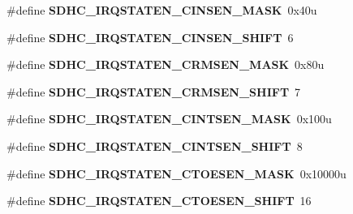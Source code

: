 \begin{DoxyCompactItemize}
\item 
\#define {\bfseries S\+D\+H\+C\+\_\+\+I\+R\+Q\+S\+T\+A\+T\+E\+N\+\_\+\+C\+I\+N\+S\+E\+N\+\_\+\+M\+A\+SK}~0x40u\hypertarget{group__SDHC__Register__Masks_ga28f8bc13ff1f5a489e41a54dc39e3152}{}\label{group__SDHC__Register__Masks_ga28f8bc13ff1f5a489e41a54dc39e3152}

\item 
\#define {\bfseries S\+D\+H\+C\+\_\+\+I\+R\+Q\+S\+T\+A\+T\+E\+N\+\_\+\+C\+I\+N\+S\+E\+N\+\_\+\+S\+H\+I\+FT}~6\hypertarget{group__SDHC__Register__Masks_gad0123206a003e799cb7aa8523ecd405c}{}\label{group__SDHC__Register__Masks_gad0123206a003e799cb7aa8523ecd405c}

\item 
\#define {\bfseries S\+D\+H\+C\+\_\+\+I\+R\+Q\+S\+T\+A\+T\+E\+N\+\_\+\+C\+R\+M\+S\+E\+N\+\_\+\+M\+A\+SK}~0x80u\hypertarget{group__SDHC__Register__Masks_ga14f097ed92b561c75e3dacc1bdefbbe2}{}\label{group__SDHC__Register__Masks_ga14f097ed92b561c75e3dacc1bdefbbe2}

\item 
\#define {\bfseries S\+D\+H\+C\+\_\+\+I\+R\+Q\+S\+T\+A\+T\+E\+N\+\_\+\+C\+R\+M\+S\+E\+N\+\_\+\+S\+H\+I\+FT}~7\hypertarget{group__SDHC__Register__Masks_ga0e48bc8d0c2f0c10d6daf191c92557a5}{}\label{group__SDHC__Register__Masks_ga0e48bc8d0c2f0c10d6daf191c92557a5}

\item 
\#define {\bfseries S\+D\+H\+C\+\_\+\+I\+R\+Q\+S\+T\+A\+T\+E\+N\+\_\+\+C\+I\+N\+T\+S\+E\+N\+\_\+\+M\+A\+SK}~0x100u\hypertarget{group__SDHC__Register__Masks_ga69074c27b92cbce82403e14f1e5a1560}{}\label{group__SDHC__Register__Masks_ga69074c27b92cbce82403e14f1e5a1560}

\item 
\#define {\bfseries S\+D\+H\+C\+\_\+\+I\+R\+Q\+S\+T\+A\+T\+E\+N\+\_\+\+C\+I\+N\+T\+S\+E\+N\+\_\+\+S\+H\+I\+FT}~8\hypertarget{group__SDHC__Register__Masks_gaa1112928a54703734f7cdc45ae77b56f}{}\label{group__SDHC__Register__Masks_gaa1112928a54703734f7cdc45ae77b56f}

\item 
\#define {\bfseries S\+D\+H\+C\+\_\+\+I\+R\+Q\+S\+T\+A\+T\+E\+N\+\_\+\+C\+T\+O\+E\+S\+E\+N\+\_\+\+M\+A\+SK}~0x10000u\hypertarget{group__SDHC__Register__Masks_ga672bdead3330e451e5e34d9f3a707504}{}\label{group__SDHC__Register__Masks_ga672bdead3330e451e5e34d9f3a707504}

\item 
\#define {\bfseries S\+D\+H\+C\+\_\+\+I\+R\+Q\+S\+T\+A\+T\+E\+N\+\_\+\+C\+T\+O\+E\+S\+E\+N\+\_\+\+S\+H\+I\+FT}~16\hypertarget{group__SDHC__Register__Masks_gae43f3a8fe91869f92453ef67ea0f4764}{}\label{group__SDHC__Register__Masks_gae43f3a8fe91869f92453ef67ea0f4764}


\end{DoxyCompactItemize}
